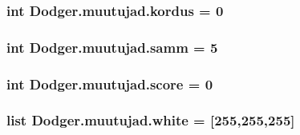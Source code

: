 \subsubsection[{kordus}]{\setlength{\rightskip}{0pt plus 5cm}int Dodger.\+muutujad.\+kordus = 0}\label{namespace_dodger_1_1muutujad_ad597bc6d76e9941c159e6ea9fb6695ba}
\hypertarget{namespace_dodger_1_1muutujad_ae7c3ed6b4ef11513d11310b665039cd1}{}
\subsubsection[{samm}]{\setlength{\rightskip}{0pt plus 5cm}int Dodger.\+muutujad.\+samm = 5}\label{namespace_dodger_1_1muutujad_ae7c3ed6b4ef11513d11310b665039cd1}
\hypertarget{namespace_dodger_1_1muutujad_a9607e1aed5a091af3b0c14ec1beab289}{}
\subsubsection[{score}]{\setlength{\rightskip}{0pt plus 5cm}int Dodger.\+muutujad.\+score = 0}\label{namespace_dodger_1_1muutujad_a9607e1aed5a091af3b0c14ec1beab289}
\hypertarget{namespace_dodger_1_1muutujad_a950ccd86c2731c52ece948ce302c6f96}{}
\subsubsection[{white}]{\setlength{\rightskip}{0pt plus 5cm}list Dodger.\+muutujad.\+white = \mbox{[}255,255,255\mbox{]}}\label{namespace_dodger_1_1muutujad_a950ccd86c2731c52ece948ce302c6f96}
